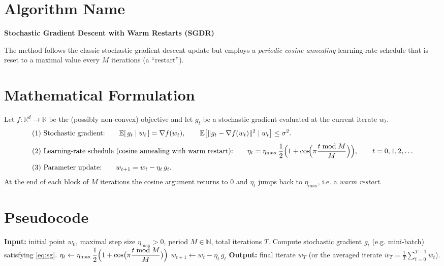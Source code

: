 \documentclass{article}
\begin{document}
\section*{Algorithm Name}
\textbf{Stochastic Gradient Descent with Warm Restarts (SGDR)}  

The method follows the classic stochastic gradient descent update but employs a \emph{periodic cosine annealing} learning‑rate schedule that is reset to a maximal value every $M$ iterations (a “restart”).  

\section*{Mathematical Formulation}
Let $f:\mathbb{R}^d\rightarrow\mathbb{R}$ be the (possibly non‑convex) objective and let $g_t$ be a stochastic gradient evaluated at the current iterate $w_t$.
\begin{align}
    &\text{(1)  Stochastic gradient:}\qquad 
        \mathbb{E}[\,g_t\mid w_t\,]=\nabla f(w_t), \qquad 
        \mathbb{E}\big[\|g_t-\nabla f(w_t)\|^2\mid w_t\big]\le\sigma^2 . \label{eq:sg}\\[4pt]
    &\text{(2)  Learning‑rate schedule (cosine annealing with warm restart):}\qquad
        \eta_t = \eta_{\max}\, \frac{1}{2}\Bigl(1+\cos\!\Bigl(\pi\frac{t\bmod M}{M}\Bigr)\Bigr), \qquad 
        t=0,1,2,\dots \label{eq:schedule}\\[4pt]
    &\text{(3)  Parameter update:}\qquad
        w_{t+1}= w_t - \eta_t\, g_t . \label{eq:update}
\end{align}
At the end of each block of $M$ iterations the cosine argument returns to $0$ and $\eta_t$ jumps back to $\eta_{\max}$, i.e. a \emph{warm restart}.

\section*{Pseudocode}
\begin{algorithm}[H]
\caption{SGDR}
\begin{algorithmic}[1]
\State \textbf{Input:} initial point $w_0$, maximal step size $\eta_{\max}>0$, period $M\in\mathbb{N}$, total iterations $T$.
    \State Compute stochastic gradient $g_t$ (e.g. mini‑batch) satisfying \eqref{eq:sg}.
    \State $\displaystyle \eta_t \gets \eta_{\max}\,\frac{1}{2}\Bigl(1+\cos\bigl(\pi\frac{t\bmod M}{M}\bigr)\Bigr)$\hfill{}
    \State $w_{t+1} \gets w_t - \eta_t\, g_t$ \hfill{}
\EndFor
\State \textbf{Output:} final iterate $w_T$ (or the averaged iterate $\bar w_T=\tfrac1T\sum_{t=0}^{T-1}w_t$).
\end{algorithmic}
\end{algorithm}
\end{document}
